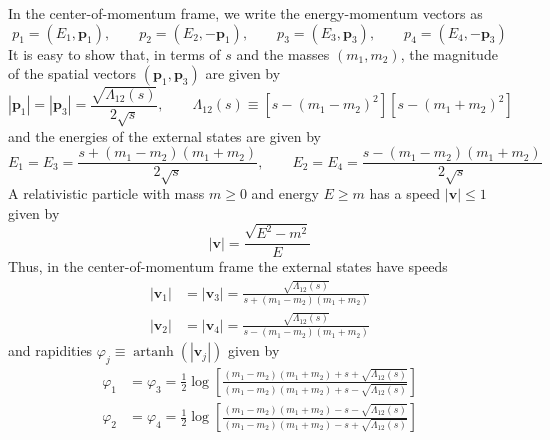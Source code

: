 In the center-of-momentum frame, we write the energy-momentum vectors as
\begin{equation}
	p_{1} = (E_{1}, \mathbf{p}_{1}), \qquad p_{2} = (E_{2}, -\mathbf{p}_{1}), \qquad p_{3} = (E_{3}, \mathbf{p}_{3}), \qquad p_{4} = (E_{4}, -\mathbf{p}_{3})
\end{equation}
It is easy to show that, in terms of $s$ and the masses $(m_{1}, m_{2})$, the magnitude of the spatial vectors $(\mathbf{p}_{1}, \mathbf{p}_{3})$ are given by
\begin{equation}
	|\mathbf{p}_{1}| = |\mathbf{p}_{3}| = \frac{\sqrt{\Lambda_{12}(s)}}{2 \sqrt{s}}, \qquad \Lambda_{12}(s) \equiv \left[s - (m_{1} - m_{2})^{2} \right] \left[s - (m_{1} + m_{2})^{2} \right] \label{2Momenta}
\end{equation}
and the energies of the external states are given by
\begin{equation}
	E_{1} = E_{3} = \frac{s + (m_{1} - m_{2})(m_{1} + m_{2})}{2 \sqrt{s}}, \qquad E_{2} = E_{4} = \frac{s - (m_{1} - m_{2})(m_{1} + m_{2})}{2 \sqrt{s}} \label{4Energies}
\end{equation}
A relativistic particle with mass $m \geq 0$ and energy $E \geq m$ has a speed $|\mathbf{v}| \leq 1$ given by
\begin{equation}
	|\mathbf{v}| = \frac{\sqrt{E^{2} - m^{2}}}{E}
\end{equation}
Thus, in the center-of-momentum frame the external states have speeds
\begin{equation}
\begin{split}
	|\mathbf{v}_{1}| &= |\mathbf{v}_{3}| = \frac{\sqrt{\Lambda_{12}(s)}}{s + (m_{1} - m_{2})(m_{1} + m_{2})} \\
	|\mathbf{v}_{2}| &= |\mathbf{v}_{4}| = \frac{\sqrt{\Lambda_{12}(s)}}{s - (m_{1} - m_{2})(m_{1} + m_{2})}
\end{split} \label{4Speeds}
\end{equation}
and rapidities $\varphi_{j} \equiv \operatorname{artanh}{(|\mathbf{v}_{j}|)}$ given by
\begin{equation}
\begin{split}
	\varphi_{1} &= \varphi_{3} = \frac{1}{2} \log{\left[ \frac{(m_{1} - m_{2})(m_{1} + m_{2}) + s + \sqrt{\Lambda_{12}(s)}}{(m_{1} - m_{2})(m_{1} + m_{2}) + s - \sqrt{\Lambda_{12}(s)}} \right]} \\
	\varphi_{2} &= \varphi_{4} = \frac{1}{2} \log{\left[ \frac{(m_{1} - m_{2})(m_{1} + m_{2}) - s - \sqrt{\Lambda_{12}(s)}}{(m_{1} - m_{2})(m_{1} + m_{2}) - s + \sqrt{\Lambda_{12}(s)}} \right]}
\end{split} \label{4Rapidities}
\end{equation}
